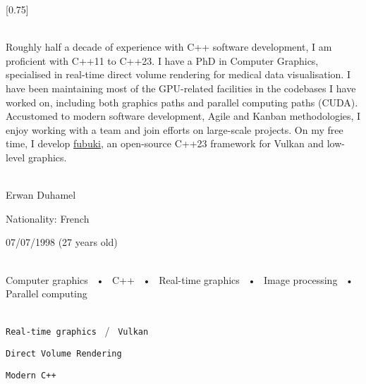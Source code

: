 \documentclass[lighthipster]{simplehipstercv}
\begin{document}
\setlength{\columnsep}{1.5cm}
[0.75]
\begin{paracol}{2}

\paracolbackgroundoptions


\footnotesize
{\setasidefontcolour
\begin{center}
    \vspace{-4.3cm}
\end{center}

\\[0.5em]
{\footnotesize
Roughly half a decade of experience with C++ software development, I am proficient with C++11 to C++23.
I have a PhD in Computer Graphics, specialised in real-time direct volume rendering for medical data visualisation.
I have been maintaining most of the GPU-related facilities in the codebases I have worked on, including both graphics paths and parallel computing paths (CUDA).
Accustomed to modern software development, Agile and Kanban methodologies, I enjoy working with a team and join efforts on large-scale projects. 
On my free time, I develop \href{https://github.com/Erellu/fubuki}{\faGithub fubuki}, an open-source C++23 framework for Vulkan and low-level graphics.
}
\bigskip

 \\[0.5em]
    Erwan Duhamel
    
    Nationality: French 
    
    07/07/1998 (27 years old)

\bigskip

 \\[0.5em]

Computer graphics ~•~ C++ ~•~ Real-time graphics ~•~ Image processing ~•~ Parallel computing

\bigskip

\\[0.5em]

\texttt{Real-time graphics} ~/~ \texttt{Vulkan}

\texttt{Direct Volume Rendering}

\texttt{Modern C++}

}
\end{paracol}
\end{document}

